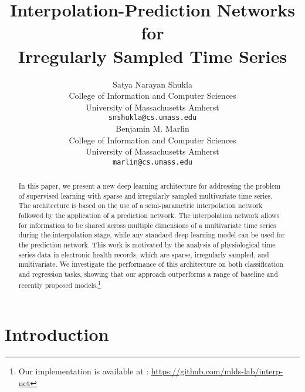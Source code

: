 \documentclass{article} \usepackage{iclr2019_conference,times}
\title{Interpolation-Prediction Networks for \\ Irregularly Sampled Time Series}
\author{Satya Narayan Shukla \\
College of Information and Computer Sciences\\
University of Massachusetts Amherst\\
\texttt{snshukla@cs.umass.edu} \\
\AND
Benjamin M. Marlin \\
College of Information and Computer Sciences\\
University of Massachusetts Amherst\\
\texttt{marlin@cs.umass.edu} \\
}
\newcommand{\cut}[1]{}
\begin{document}
\maketitle

\begin{abstract}
\cut{
While the volume of electronic health records (EHR) data continues to grow,
it remains rare for hospital systems to capture dense physiological
data streams, even in the data-rich intensive care unit setting. 
Instead, typical EHR records
consist of sparse and irregularly observed multivariate time series,
which are well understood to present particularly challenging problems
for machine learning methods. In this paper, we present a new deep learning
architecture for addressing this problem based on the use of 
a semi-parametric interpolation network followed by the 
application of a prediction network. 
The interpolation network allows for information to be shared across multiple
dimensions during the interpolation stage, while any standard
deep learning model can be used for the prediction network. 
We investigate the performance
of several versions of this architecture on the problems of mortality
and length of stay prediction. }

In this paper, we present a new deep learning architecture for addressing the problem of supervised learning with sparse and irregularly sampled multivariate time series. The architecture is based on the use of a semi-parametric interpolation network followed by the application of a prediction network. The interpolation network allows for information to be shared across multiple dimensions of a multivariate time series during the interpolation stage, while any standard deep learning model can be used for the prediction network. This work is motivated by the analysis of physiological time series data in electronic health records, which are sparse, irregularly sampled, and multivariate. We investigate the performance of this architecture on both classification and regression tasks, showing that our approach outperforms a range of baseline and recently proposed models.\footnote{
Our implementation is available at : \url{https://github.com/mlds-lab/interp-net}}
 \end{abstract}


\section{Introduction}
\end{document}
